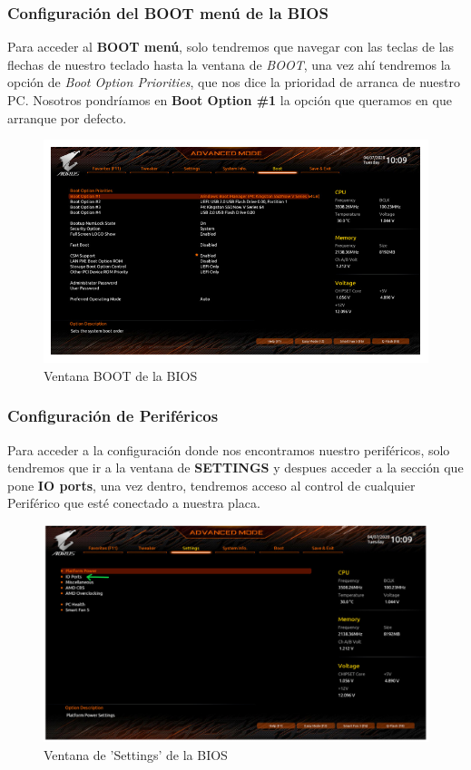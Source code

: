 \documentclass{article}
\begin{document}
          \subsubsection{Configuración del BOOT menú de la BIOS}
            Para acceder al \textbf{BOOT menú}, solo tendremos que navegar con las teclas de las flechas de nuestro teclado hasta la ventana de \textit{BOOT}, una vez ahí tendremos la opción de \textit{Boot Option Priorities}, que nos dice la prioridad de arranca 
            de nuestro PC. Nosotros pondríamos en \textbf{Boot Option \#1} la opción que queramos en que arranque por defecto.
            \begin{figure}[h]
              \centering
              \includegraphics[scale = 0.4]{img/bootMenu.png}
              \caption{Ventana BOOT de la BIOS}
            \end{figure}
          \subsubsection{Configuración de Periféricos}
            Para acceder a la configuración donde nos encontramos nuestro periféricos, solo tendremos que ir a la ventana de \textbf{SETTINGS} y despues acceder a la sección que pone \textbf{IO ports}, una vez dentro, tendremos acceso al control de cualquier Periférico 
            que esté conectado a nuestra placa.
            \begin{figure}[h]
              \centering
              \includegraphics[scale = 0.3]{img/io_bios.png}
              \caption{Ventana de 'Settings' de la BIOS}
            \end{figure} 
      \newpage
\end{document}
